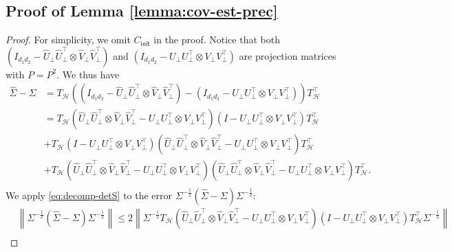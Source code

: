\documentclass[12pt]{article}
\newcommand{\norm}[1]{\left\lVert#1\right\rVert}
\def\calH{{\mathcal H}}
\newcommand{\init}{{\mathsf{init}}}
\theoremstyle{plain}
\begin{document}
\subsection{Proof of Lemma \ref{lemma:cov-est-prec}}
\begin{proof}
For simplicity, we omit $C_{\init}$ in the proof. Notice that both $\left(I_{d_1 d_2} - \widehat U_\perp \widehat U_\perp^\top \otimes \widehat V_\perp \widehat V_\perp^\top\right)$ and $\left(I_{d_1 d_2} -  U_\perp U_\perp^\top \otimes V_\perp V_\perp^\top\right)$ are projection matrices with $P=P^2$. We thus have
\begin{equation}\label{eq:decomp-detS}
   \begin{aligned}
     \widehat{\Sigma}-\Sigma&=T_{\calH}\left((I_{d_1 d_2} - \widehat U_\perp \widehat U_\perp^\top \otimes \widehat V_\perp \widehat V_\perp^\top  )-(I_{d_1 d_2} -  U_\perp U_\perp^\top \otimes V_\perp V_\perp^\top ) \right) T_{\calH}^\top \\
     & = T_{\calH}\left(\widehat U_\perp \widehat U_\perp^\top \otimes \widehat V_\perp \widehat V_\perp^\top - U_\perp U_\perp^\top \otimes V_\perp V_\perp^\top\right) \left(I-U_\perp U_\perp^\top \otimes V_\perp V_\perp^\top\right) T_{\calH}^\top\\
     & + T_{\calH}\left(I-U_\perp U_\perp^\top \otimes V_\perp V_\perp^\top\right) \left(\widehat U_\perp \widehat U_\perp^\top \otimes \widehat V_\perp \widehat V_\perp^\top - U_\perp U_\perp^\top \otimes V_\perp V_\perp^\top \right) T_{\calH}^\top \\
     & + T_{\calH}\left(\widehat U_\perp \widehat U_\perp^\top \otimes \widehat V_\perp \widehat V_\perp^\top - U_\perp U_\perp^\top \otimes V_\perp V_\perp^\top\right) \left(\widehat U_\perp \widehat U_\perp^\top \otimes \widehat V_\perp \widehat V_\perp^\top - U_\perp U_\perp^\top \otimes V_\perp V_\perp^\top\right) T_{\calH}^\top.\\
\end{aligned} 
\end{equation}
We apply \eqref{eq:decomp-detS} to the error $\Sigma^{-\frac{1}{2}}(\widehat{\Sigma}-\Sigma)\Sigma^{-\frac{1}{2}}$:
\begin{equation*}
    \begin{aligned}
      &\norm{\Sigma^{-\frac{1}{2}}(\widehat{\Sigma}-\Sigma)\Sigma^{-\frac{1}{2}} }\le 2\norm{\Sigma^{-\frac{1}{2}}T_{\calH}\left(\widehat U_\perp \widehat U_\perp^\top \otimes \widehat V_\perp \widehat V_\perp^\top - U_\perp U_\perp^\top \otimes V_\perp V_\perp^\top\right) \left(I-U_\perp U_\perp^\top \otimes V_\perp V_\perp^\top\right) T_{\calH}^\top \Sigma^{-\frac{1}{2}} }\\

\end{aligned}
\end{equation*}
\end{proof}
\end{document}
